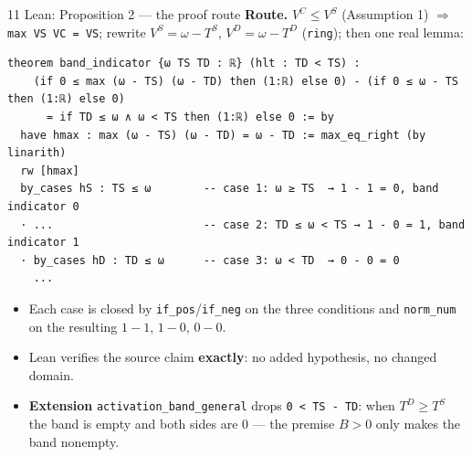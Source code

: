\documentclass[aspectratio=169,11pt]{beamer}
\begin{document}
\begin{frame}[fragile]{11 \textperiodcentered{} Lean: Proposition 2 --- the proof route}
  \small\textbf{Route.} $V^C\le V^S$ (Assumption 1) $\Rightarrow$ \texttt{max VS VC = VS}; rewrite
  $V^S=\omega-T^S$, $V^D=\omega-T^D$ (\texttt{ring}); then one real lemma:
\begin{lstlisting}
theorem band_indicator {ω TS TD : ℝ} (hlt : TD < TS) :
    (if 0 ≤ max (ω - TS) (ω - TD) then (1:ℝ) else 0) - (if 0 ≤ ω - TS then (1:ℝ) else 0)
      = if TD ≤ ω ∧ ω < TS then (1:ℝ) else 0 := by
  have hmax : max (ω - TS) (ω - TD) = ω - TD := max_eq_right (by linarith)
  rw [hmax]
  by_cases hS : TS ≤ ω        -- case 1: ω ≥ TS  → 1 - 1 = 0, band indicator 0
  · ...                       -- case 2: TD ≤ ω < TS → 1 - 0 = 1, band indicator 1
  · by_cases hD : TD ≤ ω      -- case 3: ω < TD  → 0 - 0 = 0
    ...
\end{lstlisting}
  \begin{itemize}\small
    \item Each case is closed by \texttt{if\_pos}/\texttt{if\_neg} on the three conditions and
      \texttt{norm\_num} on the resulting $1-1$, $1-0$, $0-0$.
    \item Lean verifies the source claim \textbf{exactly}: no added hypothesis, no changed domain.
    \item \textbf{Extension} \texttt{activation\_band\_general} drops \texttt{0 < TS - TD}: when
      $T^D\ge T^S$ the band is empty and both sides are $0$ --- the premise $B>0$ only makes the
      band nonempty.
  \end{itemize}
\end{frame}
\end{document}

